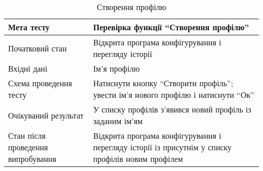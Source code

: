 \small\begin{longtable}{| C{6cm} | C{10cm} |}
  \caption{Створення профілю}
  \label{table:create-profile} \\
  \hline
  Мета тесту & Перевірка функції ``Створення профілю'' \\
  \hline
  Початковий стан
  & Відкрита програма конфігурування і перегляду історії \\
  \hline
  Вхідні дані
  & Ім'я профілю \\
  \hline
  Схема проведення тесту
  & Натиснути кнопку ``Створити профіль''; увести ім'я нового профілю і натиснути ``Ок'' \\
  \hline
  Очікуваний результат
  & У списку профілів з'явився новий профіль із заданим ім'ям \\
  \hline
  Стан після проведення випробування
  & Відкрита програма конфігурування і перегляду історії із присутнім
  у списку профілів новим профілем \\
  \hline
\end{longtable}\normalsize

